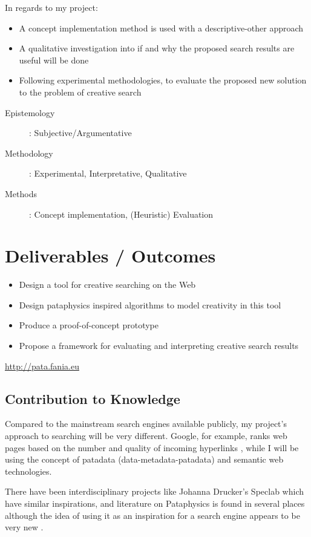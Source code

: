 In regards to my project:
\begin{itemize}
  \item A concept implementation method is used with a descriptive-other approach
  \item A qualitative investigation into if and why the proposed search results are useful will be done
  \item Following experimental methodologies, to evaluate the proposed new solution to the problem of creative search
\end{itemize}

\begin{description}
  \item [Epistemology]: Subjective/Argumentative
  \item [Methodology]: Experimental, Interpretative, Qualitative
  \item [Methods]: Concept implementation, (Heuristic) Evaluation
\end{description}

\section{Deliverables / Outcomes}

\begin{itemize}
  \item Design a tool for creative searching on the Web
  \item Design pataphysics inspired algorithms to model creativity in this tool
  \item Produce a proof-of-concept prototype
  \item Propose a framework for evaluating and interpreting creative search results
\end{itemize}

\url{http://pata.fania.eu} \marginpar{!!!}

\subsection{Contribution to Knowledge}

Compared to the mainstream search engines available publicly, my project's approach to searching will be very different. Google, for example, ranks web pages based on the number and quality of incoming hyperlinks \autocite{Google2012}, while I will be using the concept of patadata (data-metadata-patadata) and semantic web technologies.

There have been interdisciplinary projects like Johanna Drucker's Speclab {\sloppy \autocite{Drucker2009}} which have similar inspirations, and literature on Pataphysics is found in several places \autocite{Boek2002, Hugill2012a} although the idea of using it as an inspiration for a search engine appears to be very new \autocite{Hendler2013}.

